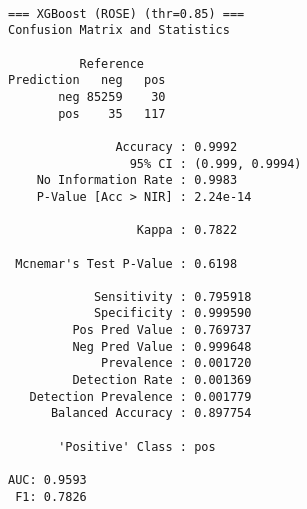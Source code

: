 \documentclass[
  11pt,
  letterpaper,
  DIV=11,
  numbers=noendperiod]{scrartcl}
\newenvironment{Shaded}{}{}
\newcommand{\AttributeTok}[1]{\textcolor[rgb]{0.84,0.23,0.29}{#1}}
\newcommand{\DocumentationTok}[1]{\textcolor[rgb]{0.42,0.45,0.49}{#1}}
\newcommand{\FunctionTok}[1]{\textcolor[rgb]{0.44,0.26,0.76}{#1}}
\newcommand{\NormalTok}[1]{\textcolor[rgb]{0.14,0.16,0.18}{#1}}
\newcommand{\OtherTok}[1]{\textcolor[rgb]{0.44,0.26,0.76}{#1}}
\newcommand{\SpecialCharTok}[1]{\textcolor[rgb]{0.00,0.36,0.77}{#1}}
\newcommand{\StringTok}[1]{\textcolor[rgb]{0.01,0.18,0.38}{#1}}
\begin{document}
\begin{verbatim}

=== XGBoost (ROSE) (thr=0.85) ===
Confusion Matrix and Statistics

          Reference
Prediction   neg   pos
       neg 85259    30
       pos    35   117
                                         
               Accuracy : 0.9992         
                 95% CI : (0.999, 0.9994)
    No Information Rate : 0.9983         
    P-Value [Acc > NIR] : 2.24e-14       
                                         
                  Kappa : 0.7822         
                                         
 Mcnemar's Test P-Value : 0.6198         
                                         
            Sensitivity : 0.795918       
            Specificity : 0.999590       
         Pos Pred Value : 0.769737       
         Neg Pred Value : 0.999648       
             Prevalence : 0.001720       
         Detection Rate : 0.001369       
   Detection Prevalence : 0.001779       
      Balanced Accuracy : 0.897754       
                                         
       'Positive' Class : pos            
                                         
AUC: 0.9593 
 F1: 0.7826 
\end{verbatim}

\begin{Shaded}
\end{Shaded}
\end{document}

